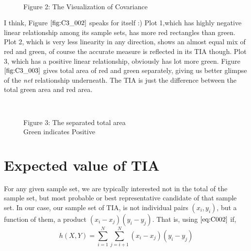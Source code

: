 \documentclass[float=false,crop=false]{standalone}
\begin{document}
\begin{figure}
\centering%
    \begin{center}
    \end{center}
    { \hspace*{\fill} \\}
    \caption{Figure 2: The Visualization of Covariance} \label{fig:C3_002}
\end{figure}
    I think, Figure \(\ref{fig:C3_002}\) speaks for itself :) Plot 1,which
has highly negative linear relationship among its sample sets, has more
red rectangles than green. Plot 2, which is very less linearity in any
direction, shows an almost equal mix of red and green, of course the
accurate measure is reflected in its TIA though. Plot 3, which has a
positive linear relationship, obviously has lot more green. Figure
\(\ref{fig:C3_003}\) gives total area of red and green separately,
giving us better glimpse of the \emph{net} relationship underneath. The
TIA is just the difference between the total green area and red area.

\begin{figure}
\centering%
    \begin{center}
    \end{center}
    { \hspace*{\fill} \\}
    \caption{Figure 3: The separated total area \\Green indicates Positive} \label{fig:C3_003}
\end{figure}
    \section{Expected value of TIA}\label{expected-value-of-tia}

For any given sample set, we are typically interested not in the total
of the sample set, but most probable or best representative candidate of
that sample set. In our case, our sample set of TIA, is not individual
pairs \((x_i,y_i)\), but a function of them, a product
\((x_i-x_j)(y_i-y_j)\). That is, using \(\ref{eq:C002}\) if,\\
\[
h(X,Y) = \sum\limits_{i=1}^N\sum\limits_{j=i+1}^{N}(x_i - x_j)(y_i - y_j)
\]
\end{document}
